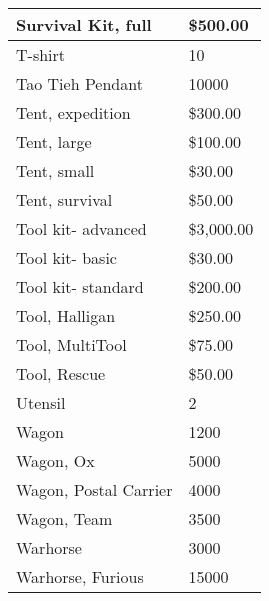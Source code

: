 \documentclass[twoside]{book}
\begin{document}
\begin{longtable}{p{1.25in}l}
  \raggedright
           Survival Kit, full 
  &
   \$500.00 
  \tabularnewline
  \hline
      
  \raggedright
           T-shirt 
  &
   10 
  \tabularnewline
  \hline
      
  \raggedright
           Tao Tieh Pendant 
  &
   10000 
  \tabularnewline
  \hline
      
  \raggedright
           Tent, expedition 
  &
   \$300.00 
  \tabularnewline
  \hline
      
  \raggedright
           Tent, large 
  &
   \$100.00 
  \tabularnewline
  \hline
      
  \raggedright
           Tent, small 
  &
   \$30.00 
  \tabularnewline
  \hline
      
  \raggedright
           Tent, survival 
  &
   \$50.00 
  \tabularnewline
  \hline
      
  \raggedright
           Tool kit- advanced 
  &
   \$3,000.00 
  \tabularnewline
  \hline
      
  \raggedright
           Tool kit- basic 
  &
   \$30.00 
  \tabularnewline
  \hline
      
  \raggedright
           Tool kit- standard 
  &
   \$200.00 
  \tabularnewline
  \hline
      
  \raggedright
           Tool, Halligan 
  &
   \$250.00 
  \tabularnewline
  \hline
      
  \raggedright
           Tool, MultiTool 
  &
   \$75.00 
  \tabularnewline
  \hline
      
  \raggedright
           Tool, Rescue 
  &
   \$50.00 
  \tabularnewline
  \hline
      
  \raggedright
           Utensil 
  &
   2 
  \tabularnewline
  \hline
      
  \raggedright
           Wagon 
  &
   1200 
  \tabularnewline
  \hline
      
  \raggedright
           Wagon, Ox 
  &
   5000 
  \tabularnewline
  \hline
      
  \raggedright
           Wagon, Postal Carrier 
  &
   4000 
  \tabularnewline
  \hline
      
  \raggedright
           Wagon, Team 
  &
   3500 
  \tabularnewline
  \hline
      
  \raggedright
           Warhorse 
  &
   3000 
  \tabularnewline
  \hline
      
  \raggedright
           Warhorse, Furious 
  &
   15000 
  \tabularnewline
  \hline
      

\end{longtable}
\end{document}
